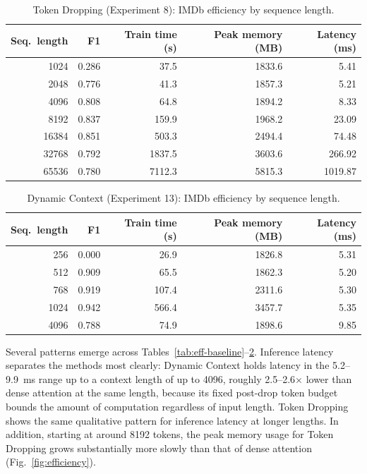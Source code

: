 \documentclass[11pt]{article}
\begin{document}
\begin{table}[ht]
  \centering
  \small
  \caption{Token Dropping (Experiment 8): IMDb efficiency by sequence length.}
  \label{tab:eff-tokendrop}
  \begin{tabular}{@{}rrrrr@{}}
    \toprule
    Seq.\ length & F1 & Train time (s) & Peak memory (MB) & Latency (ms) \\
    \midrule
    1024   & 0.286 & 37.5   & 1833.6   & 5.41 \\
    2048   & 0.776 & 41.3   & 1857.3   & 5.21 \\
    4096   & 0.808 & 64.8   & 1894.2   & 8.33 \\
    8192   & 0.837 & 159.9  & 1968.2   & 23.09 \\
    16384  & 0.851 & 503.3  & 2494.4   & 74.48 \\
    32768  & 0.792 & 1837.5 & 3603.6   & 266.92 \\
    65536  & 0.780 & 7112.3 & 5815.3   & 1019.87 \\
    \bottomrule
  \end{tabular}
\end{table}

\FloatBarrier
\begin{table}[H]
  \centering
  \small
  \caption{Dynamic Context (Experiment 13): IMDb efficiency by sequence
  length.}
  \label{tab:eff-dynamiccontext}
  \begin{tabular}{@{}rrrrr@{}}
    \toprule
    Seq.\ length & F1 & Train time (s) & Peak memory (MB) & Latency (ms) \\
    \midrule
    256    & 0.000 & 26.9  & 1826.8 & 5.31 \\
    512    & 0.909 & 65.5  & 1862.3 & 5.20 \\
    768    & 0.919 & 107.4 & 2311.6 & 5.30 \\
    1024   & 0.942 & 566.4 & 3457.7 & 5.35 \\
    4096   & 0.788 & 74.9  & 1898.6 & 9.85 \\
    \bottomrule
  \end{tabular}
\end{table}

Several patterns emerge across Tables~\ref{tab:eff-baseline}--\ref{tab:eff-dynamiccontext}.
Inference latency separates the methods most clearly: Dynamic Context holds latency in the 5.2--9.9~ms range up to a context length of up to 4096, roughly 2.5--2.6$\times$ lower than dense attention at the same length, because its fixed post-drop token budget bounds the amount of computation regardless of input length. Token Dropping shows the same qualitative pattern for inference latency at longer
lengths. In addition, starting at around 8192 tokens, the peak memory usage for Token Dropping grows substantially more slowly than that of dense attention (Fig.~\ref{fig:efficiency}). 
\end{document}
